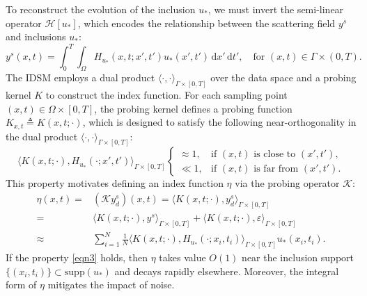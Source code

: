 \documentclass[onefignum,onetabnum]{siamart190516}
\numberwithin{equation}{section}
\begin{document}
To reconstruct the evolution of the inclusion $u_{*}$, we must invert the semi-linear operator $\mathcal{H}[u_{*}]$, which encodes the relationship between the scattering field $y^{s}$ and inclusions $u_{*}$:
\begin{equation*}
y^s(x,t) = \int_{0}^{T} \int_{\Omega} H_{u_{*}}(x,t; x',t') u_{*}(x',t') \, \mathrm{d}x' \, \mathrm{d}t', \quad \text{for } (x,t) \in \Gamma\times(0,T).
\end{equation*}
The IDSM employs a dual product $\langle \cdot, \cdot \rangle_{\Gamma \times [0,T]}$ over the data space and a probing kernel $K$
to construct the index function.
For each sampling point $(x,t)\in \Omega\times[0,T]$, the probing kernel defines a probing function $K_{x,t}\triangleq K(x,t;\cdot)$, which is designed to satisfy the following near-orthogonality in the dual product $\langle \cdot, \cdot \rangle_{\Gamma \times [0,T]}$:
\begin{equation} \label{eqn3}
\langle K(x,t; \cdot), H_{u_{*}}(\cdot; x', t') \rangle_{\Gamma \times [0,T]}
\begin{cases}
\approx 1, & \text{if } (x,t) \text{ is close to } (x',t'), \\
\ll 1, & \text{if } (x,t) \text{ is far from } (x',t').
\end{cases}
\end{equation}
This property motivates defining an index function $\eta$ via the probing operator $\mathcal{K}$:
\begin{align*}
\eta(x,t) =&\left(\mathcal{K}y^{s}_{d}\right)(x,t) = \langle K(x,t; \cdot), y^s_d \rangle_{\Gamma \times [0,T]} \\
=& \langle K(x,t; \cdot), y^s \rangle_{\Gamma \times [0,T]} + \langle K(x,t; \cdot), \varepsilon \rangle_{\Gamma \times [0,T]} \\
\approx& \sum_{i=1}^{N} \frac{1}{N} \langle K(x,t; \cdot), H_{u_{*}}(\cdot; x_i, t_i) \rangle_{\Gamma \times [0,T]} u_{*}(x_i, t_i).
\end{align*}
If the property \eqref{eqn3} holds, then $\eta$ takes value $O(1)$ near the inclusion support $\{(x_i, t_i)\} \subset \mathrm{supp}(u_{*})$ and decays rapidly elsewhere.
Moreover, the integral form of $\eta$ mitigates the impact of noise.
\end{document}
